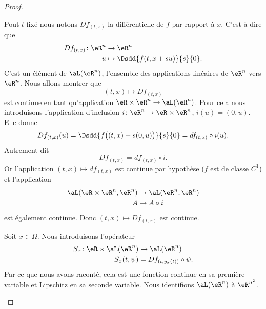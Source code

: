 \begin{proof}
	\begin{subproof}
		Pout \( t\) fixé nous notons \( Df_{(t,x)}\) la différentielle de \( f\) par rapport à \( x\). C'est-à-dire que
		\begin{equation}
			\begin{aligned}
				Df_{(t,x)}\colon \eR^n & \to \eR^n                         \\
				u                      & \mapsto \Dsdd{ f(t,x+su) }{s}{0}.
			\end{aligned}
		\end{equation}
		C'est un élément de \( \aL(\eR^n)\), l'ensemble des applications linéaires de \( \eR^n\) vers \( \eR^n\). Nous allons montrer que
		\begin{equation}
			(t,x)\mapsto Df_{(t,x)}
		\end{equation}
		est continue en tant qu'application \( \eR\times \eR^n\to\aL(\eR^n)\). Pour cela nous introduisons l'application d'inclusion \( i\colon \eR^n\to \eR\times \eR^n\), \( i(u)=(0,u)\). Elle donne
		\begin{equation}
			Df_{(t,x)}(u)=\Dsdd{ f\big( (t,x)+s(0,u) \big) }{s}{0}=df_{(t,x)}\circ i (u).
		\end{equation}
		Autrement dit
		\begin{equation}
			Df_{(t,x)}=df_{(t,x)}\circ i.
		\end{equation}
		Or l'application \( (t,x)\mapsto df_{(t,x)} \) est continue par hypothèse (\( f\) est de classe \( C^1\)) et l'application
		\begin{equation}        \label{EQooZTAPooCduWcl}
			\begin{aligned}
				\aL(\eR\times \eR^n,\eR^n) & \to \aL(\eR^n,\eR^n) \\
				A                          & \mapsto A\circ i
			\end{aligned}
		\end{equation}
		est également continue. Donc \( (t,x)\mapsto Df_{(t,x)}\) est continue.


		Soit \( x\in \Omega\). Nous introduisons l'opérateur
		\begin{equation}
			\begin{aligned}
				S_x\colon \eR\times \aL(\eR^n) & \to \aL(\eR^n)              \\
				S_x(t,\psi)                    & =Df_{(t,y_x(t))}\circ \psi.
			\end{aligned}
		\end{equation}
		Par ce que nous avons raconté, cela est une fonction continue en sa première variable et Lipschitz en sa seconde variable. Nous identifions \( \aL(\eR^n)\) à \( \eR^{n^2}\).


\end{subproof}
\end{proof}
